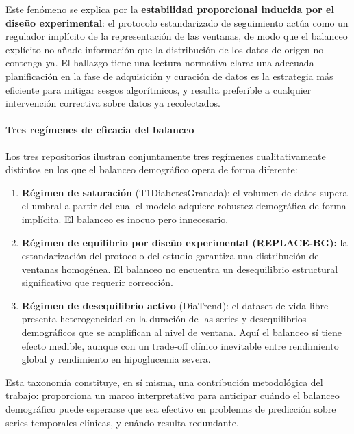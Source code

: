 Este fenómeno se explica por la \textbf{estabilidad proporcional inducida por el diseño experimental}: el protocolo estandarizado de seguimiento actúa como un regulador implícito de la representación de las ventanas, de modo que el balanceo explícito no añade información que la distribución de los datos de origen no contenga ya.
El hallazgo tiene una lectura normativa clara: una adecuada planificación en la
fase de adquisición y curación de datos es la estrategia más eficiente para mitigar
sesgos algorítmicos, y resulta preferible a cualquier intervención correctiva sobre
datos ya recolectados.

\paragraph{Tres regímenes de eficacia del balanceo}

Los tres repositorios ilustran conjuntamente tres regímenes cualitativamente
distintos en los que el balanceo demográfico opera de forma diferente:

\begin{enumerate}
    \item \textbf{Régimen de saturación} (T1DiabetesGranada): el volumen de datos
    supera el umbral a partir del cual el modelo adquiere robustez demográfica de
    forma implícita. El balanceo es inocuo pero innecesario.

    \item \textbf{Régimen de equilibrio por diseño experimental (REPLACE-BG):} la estandarización del protocolo del estudio garantiza una distribución de ventanas homogénea. El balanceo no encuentra un desequilibrio estructural significativo que requerir corrección.

    \item \textbf{Régimen de desequilibrio activo} (DiaTrend): el dataset de vida
    libre presenta heterogeneidad en la duración de las series y desequilibrios
    demográficos que se amplifican al nivel de ventana. Aquí el balanceo sí tiene
    efecto medible, aunque con un trade-off clínico inevitable entre rendimiento
    global y rendimiento en hipoglucemia severa.
\end{enumerate}

Esta taxonomía constituye, en sí misma, una contribución metodológica del trabajo:
proporciona un marco interpretativo para anticipar cuándo el balanceo demográfico
puede esperarse que sea efectivo en problemas de predicción sobre series temporales
clínicas, y cuándo resulta redundante.

